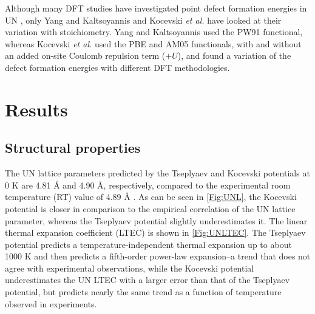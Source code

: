 \documentclass[preprint, 12pt]{elsarticle}
\begin{document}
Although many DFT studies have investigated point defect formation energies in UN \cite{Kotomin2007, Bocharov2011, Lan2013, Kuksin2016, Tseplyaev2016, Kocevski2022II}, only Yang and Kaltsoyannis \cite{Yang2021} and Kocevski \textit{et al.} \cite{Kocevski2022I} have looked at their variation with stoichiometry. Yang and Kaltsoyannis used the PW91 functional, whereas Kocevski \textit{et al.} used the PBE and AM05 functionals, with and without an added on-site Coulomb repulsion term ($+U$), and found a variation of the defect formation energies with different DFT methodologies.

\section{Results}

\subsection{Structural properties}

The UN lattice parameters predicted by the Tseplyaev and Kocevski potentials at 0 K are 4.81 {\AA} and 4.90 {\AA}, respectively, compared to the experimental room temperature (RT) value of 4.89 {\AA} \cite{Hayes1990I}. As can be seen in \cref{Fig:UNL}, the Kocevski potential is closer in comparison to the empirical correlation of the UN lattice parameter, whereas the Tseplyaev potential slightly underestimates it. The linear thermal expansion coefficient (LTEC) is shown in \cref{Fig:UNLTEC}. The Tseplyaev potential predicts a temperature-independent thermal expansion up to about 1000 K and then predicts a fifth-order power-law expansion--a trend that does not agree with experimental observations, while the Kocevski potential underestimates the UN LTEC with a larger error than that of the Tseplyaev potential, but predicts nearly the same trend as a function of temperature observed in experiments.
\end{document}
